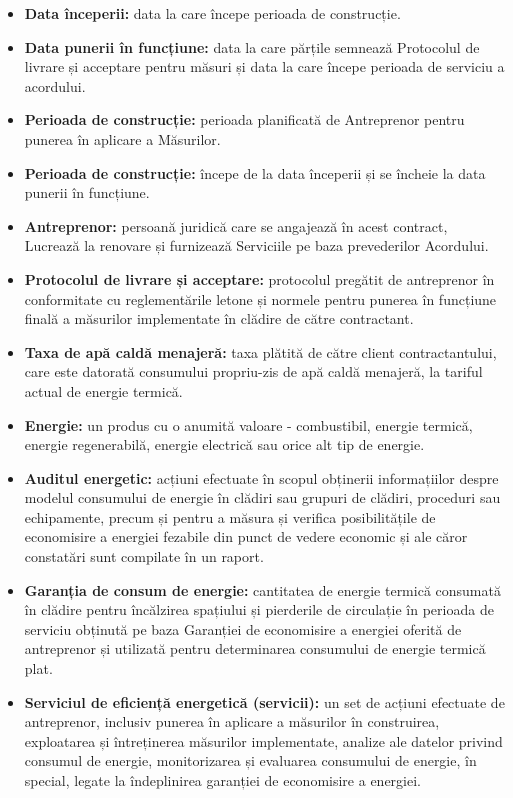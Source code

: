 \begin{multicols}{2}
\begin{itemize}[label={}]
\item\textbf{Data începerii:} data la care începe perioada de construcție.
\item\textbf{Data punerii în funcțiune:} data la care părțile semnează Protocolul de livrare și acceptare pentru măsuri și data la care începe perioada de serviciu a acordului.
\item\textbf{Perioada de construcție:} perioada planificată de Antreprenor pentru punerea în aplicare a Măsurilor.
\item\textbf{Perioada de construcție:} începe de la data începerii și se încheie la data punerii în funcțiune.
\item\textbf{Antreprenor:} persoană juridică care se angajează în acest contract, Lucrează la renovare și furnizează Serviciile pe baza prevederilor Acordului.
\item\textbf{Protocolul de livrare și acceptare:} protocolul pregătit de antreprenor în conformitate cu reglementările letone și normele pentru punerea în funcțiune finală a măsurilor implementate în clădire de către contractant.
\item\textbf{Taxa de apă caldă menajeră:} taxa plătită de către client contractantului, care este datorată consumului propriu-zis de apă caldă menajeră, la tariful actual de energie termică.
\item\textbf{Energie:} un produs cu o anumită valoare - combustibil, energie termică, energie regenerabilă, energie electrică sau orice alt tip de energie.
\item\textbf{Auditul energetic:} acțiuni efectuate în scopul obținerii informațiilor despre modelul consumului de energie în clădiri sau grupuri de clădiri, proceduri sau echipamente, precum și pentru a măsura și verifica posibilitățile de economisire a energiei fezabile din punct de vedere economic și ale căror constatări sunt compilate în un raport.
\item\textbf{Garanția de consum de energie:} cantitatea de energie termică consumată în clădire pentru încălzirea spațiului și pierderile de circulație în perioada de serviciu obținută pe baza Garanției de economisire a energiei oferită de antreprenor și utilizată pentru determinarea consumului de energie termică plat.
\item\textbf{Serviciul de eficiență energetică (servicii):} un set de acțiuni efectuate de antreprenor, inclusiv punerea în aplicare a măsurilor în construirea, exploatarea și întreținerea măsurilor implementate, analize ale datelor privind consumul de energie, monitorizarea și evaluarea consumului de energie, în special, legate la îndeplinirea garanției de economisire a energiei.

\end{itemize}
\end{multicols}
